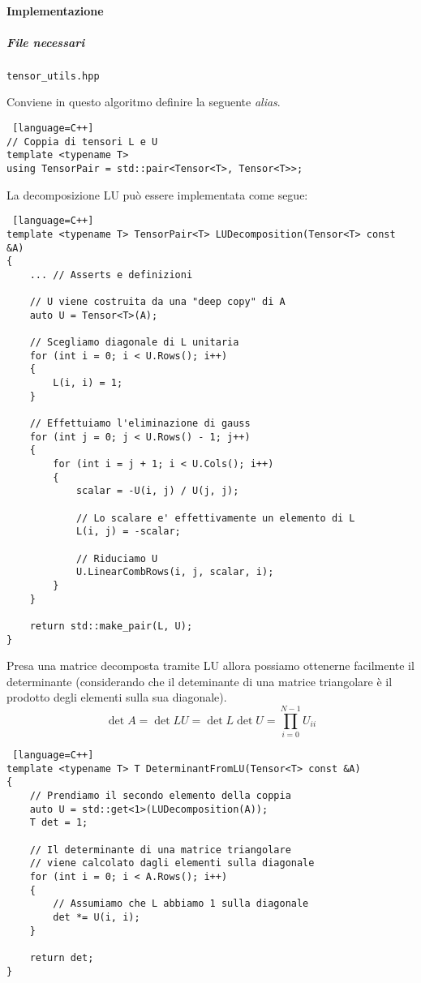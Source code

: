\paragraph{Implementazione}

\subparagraph{File necessari} \texttt{tensor\_utils.hpp}

Conviene in questo algoritmo definire la seguente \textit{alias}.

\begin{lstlisting} [language=C++]
// Coppia di tensori L e U
template <typename T>
using TensorPair = std::pair<Tensor<T>, Tensor<T>>;
\end{lstlisting}

La decomposizione LU può essere implementata come segue:

\begin{lstlisting} [language=C++]
template <typename T> TensorPair<T> LUDecomposition(Tensor<T> const &A)
{
    ... // Asserts e definizioni

    // U viene costruita da una "deep copy" di A
    auto U = Tensor<T>(A);

    // Scegliamo diagonale di L unitaria
    for (int i = 0; i < U.Rows(); i++)
    {
        L(i, i) = 1;
    }

    // Effettuiamo l'eliminazione di gauss
    for (int j = 0; j < U.Rows() - 1; j++)
    {
        for (int i = j + 1; i < U.Cols(); i++)
        {
            scalar = -U(i, j) / U(j, j);

            // Lo scalare e' effettivamente un elemento di L
            L(i, j) = -scalar;

            // Riduciamo U
            U.LinearCombRows(i, j, scalar, i);
        }
    }

    return std::make_pair(L, U);
}
\end{lstlisting}

Presa una matrice decomposta tramite LU allora possiamo ottenerne facilmente il
determinante (considerando che il deteminante di una matrice triangolare è il prodotto
degli elementi sulla sua diagonale).
$$
	\det{A} = \det{LU} = \det{L} \det{U} = \prod_{i=0}^{N-1} U_{ii}
$$

\begin{lstlisting} [language=C++]
template <typename T> T DeterminantFromLU(Tensor<T> const &A)
{
    // Prendiamo il secondo elemento della coppia
    auto U = std::get<1>(LUDecomposition(A));
    T det = 1;

    // Il determinante di una matrice triangolare 
    // viene calcolato dagli elementi sulla diagonale
    for (int i = 0; i < A.Rows(); i++)
    {
        // Assumiamo che L abbiamo 1 sulla diagonale
        det *= U(i, i);
    }

    return det;
}
\end{lstlisting}

